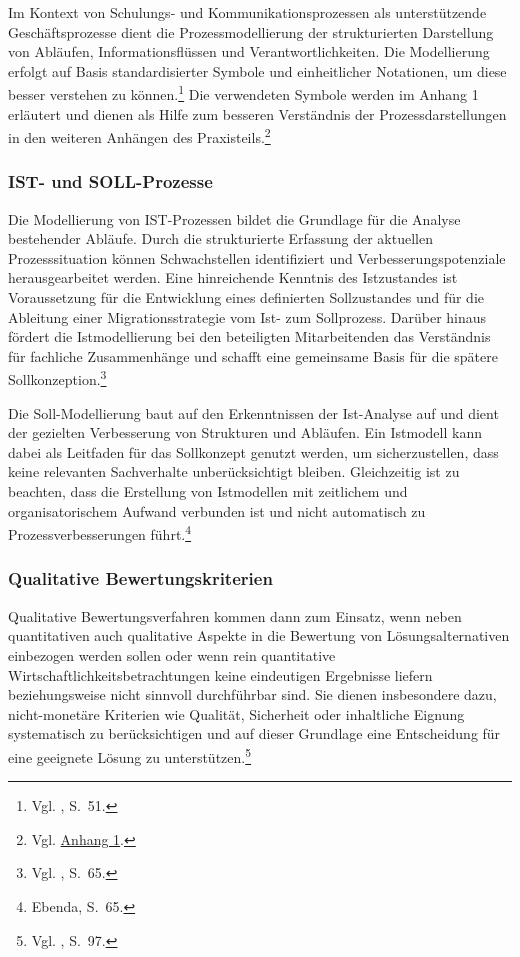\documentclass[
    12pt, 
    a4paper,
    ]{scrartcl} %
\begin{document}
Im Kontext von Schulungs- und Kommunikationsprozessen als unterstützende Geschäftsprozesse dient die Prozessmodellierung der strukturierten Darstellung von Abläufen, Informationsflüssen und Verantwortlichkeiten. Die Modellierung erfolgt auf Basis standardisierter Symbole und einheitlicher Notationen, um diese besser verstehen zu können.\footnote{Vgl. \cite{Koch_Geschaeftsprozessmanagement}, S.~51.} Die verwendeten Symbole werden im Anhang 1 erläutert und dienen als Hilfe zum besseren Verständnis der Prozessdarstellungen in den weiteren Anhängen des Praxisteils.\footnote{Vgl. \hyperref[sec:Anhang1]{Anhang 1}.}

\subsubsection{IST- und SOLL-Prozesse}
Die Modellierung von IST-Prozessen bildet die Grundlage für die Analyse bestehender Abläufe. Durch die strukturierte Erfassung der aktuellen Prozesssituation können Schwachstellen identifiziert und Verbesserungspotenziale herausgearbeitet werden. Eine hinreichende Kenntnis des Istzustandes ist Voraussetzung für die Entwicklung eines definierten Sollzustandes und für die Ableitung einer Migrationsstrategie vom Ist- zum Sollprozess. Darüber hinaus fördert die Istmodellierung bei den beteiligten Mitarbeitenden das Verständnis für fachliche Zusammenhänge und schafft eine gemeinsame Basis für die spätere Sollkonzeption.\footnote{Vgl. \cite{Koch_Geschaeftsprozessmanagement}, S.~65.} 

Die Soll-Modellierung baut auf den Erkenntnissen der Ist-Analyse auf und dient der gezielten Verbesserung von Strukturen und Abläufen. Ein Istmodell kann dabei als Leitfaden für das Sollkonzept genutzt werden, um sicherzustellen, dass keine relevanten Sachverhalte unberücksichtigt bleiben. Gleichzeitig ist zu beachten, dass die Erstellung von Istmodellen mit zeitlichem und organisatorischem Aufwand verbunden ist und nicht automatisch zu Prozessverbesserungen führt.\footnote{Ebenda, S.~65.}

\subsubsection{Qualitative Bewertungskriterien}
Qualitative Bewertungsverfahren kommen dann zum Einsatz, wenn neben quantitativen auch qualitative Aspekte in die Bewertung von Lösungsalternativen einbezogen werden sollen oder wenn rein quantitative Wirtschaftlichkeitsbetrachtungen keine eindeutigen Ergebnisse liefern beziehungsweise nicht sinnvoll durchführbar sind. Sie dienen insbesondere dazu, nicht-monetäre Kriterien wie Qualität, Sicherheit oder inhaltliche Eignung systematisch zu berücksichtigen und auf dieser Grundlage eine Entscheidung für eine geeignete Lösung zu unterstützen.\footnote{Vgl. \cite{Koch_Geschaeftsprozessmanagement}, S.~97.} 
\end{document}
